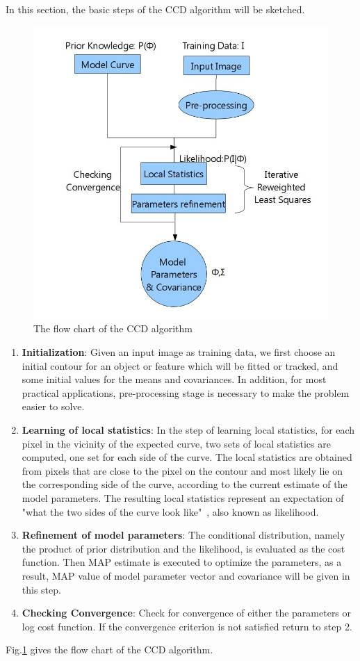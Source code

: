 In this section, the basic steps of the CCD algorithm will be
sketched. 
\begin{figure}[htb]
  \centering
  \includegraphics[width=12cm]{images/flowchart.jpg}
  \caption[The flow chart of
  the CCD algorithm]{The flow chart of the CCD algorithm}
  \label{fig:flowchart}
\end{figure}
\begin{enumerate}
\item \textbf{Initialization}: Given an input image as training data, we first choose an initial
contour for an object or feature which will be fitted or tracked, and
some initial values for the means and covariances. In addition, for most practical
applications, 
pre-processing stage is necessary to make the problem easier to solve. 
\item \textbf{Learning of local statistics}: In the step of learning local
  statistics, for each pixel in the
vicinity of the expected curve, two sets of local statistics
are computed, one set for each side of the curve. The local statistics are obtained from
pixels that are close to the pixel on the contour and most likely lie
on the corresponding side of the curve, according to the current
estimate of the model parameters. The resulting local statistics
represent an expectation of "what the two sides of the curve look
like"~\cite{hanek2004contracting}, also known as likelihood.
\item \textbf{Refinement of model parameters}: The conditional distribution, namely
  the product of prior distribution and  the likelihood, is evaluated
  as the cost function. Then MAP estimate is executed to optimize the
  parameters, as a result, MAP value of model parameter vector and
  covariance will be given in this step.
\item \textbf{Checking Convergence}: Check for convergence of either
  the parameters or log cost function. If the convergence criterion is
  not satisfied return to step 2.
\end{enumerate}
Fig.\ref{fig:flowchart} gives the flow chart of the CCD algorithm.

